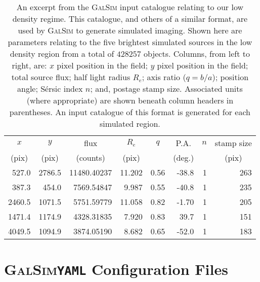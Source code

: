 \documentclass[fleqn,usenatbib,useAMS]{mnras}
\newcommand*{\Sersic}{S\'{e}rsic\xspace}
\newcommand*{\GalSim}{\textsc{GalSim}\xspace}
\begin{document}
\begin{table}
    \setlength{\tabcolsep}{2.5pt}
    \begin{tabular}{ r | r | r | r | r | r | r | r }
    \multicolumn{1}{c}{$x$} & \multicolumn{1}{c}{$y$} & \multicolumn{1}{c}{flux} & \multicolumn{1}{c}{$R_e$} & \multicolumn{1}{c}{$q$} & \multicolumn{1}{c}{P.A.} & \multicolumn{1}{c}{$n$} & \multicolumn{1}{c}{stamp size}\\
    \multicolumn{1}{c}{(pix)} & \multicolumn{1}{c}{(pix)} & \multicolumn{1}{c}{(counts)} & \multicolumn{1}{c}{(pix)} & \multicolumn{1}{c}{ } & \multicolumn{1}{c}{(deg.)} & \multicolumn{1}{c}{ } & \multicolumn{1}{c}{(pix)}\\
    \hline
    527.0 & 2786.5 & 11480.40237 & 11.202 & 0.56 & -38.8 & 1 & 263 \\
    387.3 & 454.0 & 7569.54847 & 9.987 & 0.55 & -40.8 & 1 & 235 \\
    2460.5 & 1071.5 & 5751.59779 & 11.058 & 0.82 & -1.70 & 1 & 205 \\
    1471.4 & 1174.9 & 4328.31835 & 7.920 & 0.83 & 39.7 & 1 & 151 \\
    4049.5 & 1094.9 & 3874.05190 & 8.682 & 0.65 & -52.0 & 1 & 183
    \end{tabular}
    \caption{An excerpt from the \GalSim input catalogue relating to our low density regime. This catalogue, and others of a similar format, are used by \GalSim to generate simulated imaging. Shown here are parameters relating to the five brightest simulated sources in the low density region from a total of $428257$ objects. Columns, from left to right, are: $x$ pixel position in the field; $y$ pixel position in the field; total source flux; half light radius $R_e$; axis ratio ($q=b/a$); position angle; \Sersic index $n$; and, postage stamp size. Associated units (where appropriate) are shown beneath column headers in parentheses. An input catalogue of this format is generated for each simulated region.}
    \label{tab:simcat}
\end{table}

\section{\GalSim \bf\texttt{YAML} Configuration Files}
\label{sec:yamlconfig}
\end{document}
